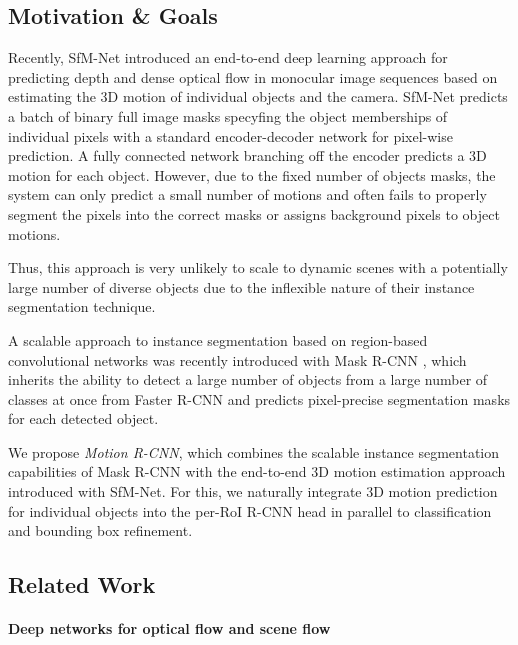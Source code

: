 \subsection{Motivation \& Goals}


Recently, SfM-Net \cite{SfmNet} introduced an end-to-end deep learning approach for predicting depth
and dense optical flow in monocular image sequences based on estimating the 3D motion of individual objects and the camera.
SfM-Net predicts a batch of binary full image masks specyfing the object memberships of individual pixels with a standard encoder-decoder
network for pixel-wise prediction. A fully connected network branching off the encoder predicts a 3D motion for each object.
However, due to the fixed number of objects masks, the system can only predict a small number of motions and
often fails to properly segment the pixels into the correct masks or assigns background pixels to object motions.

Thus, this approach is very unlikely to scale to dynamic scenes with a potentially
large number of diverse objects due to the inflexible nature of their instance segmentation technique.

A scalable approach to instance segmentation based on region-based convolutional networks
was recently introduced with Mask R-CNN \cite{MaskRCNN}, which inherits the ability to detect
a large number of objects from a large number of classes at once from Faster R-CNN
and predicts pixel-precise segmentation masks for each detected object.

We propose \emph{Motion R-CNN}, which combines the scalable instance segmentation capabilities of
Mask R-CNN with the end-to-end 3D motion estimation approach introduced with SfM-Net.
For this, we naturally integrate 3D motion prediction for individual objects into the per-RoI R-CNN head
in parallel to classification and bounding box refinement.

\subsection{Related Work}

\paragraph{Deep networks for optical flow and scene flow}

